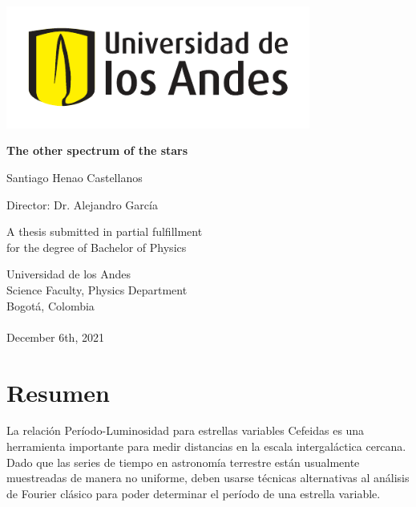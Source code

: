 \documentclass[12pt,letterpaper,oneside]{book}
\begin{document}
	\begin{titlepage}
		\begin{center}
			\includegraphics[width=10cm]{img/logo-uniandes.pdf}
			
			\vspace{2cm}
			
			{\fontsize{25}{40}\selectfont \bf The other spectrum of the stars\par}
			
			\vspace{10mm}
			
			{\huge Santiago Henao Castellanos}
			
			\vspace{10mm}
			
			{\huge Director: Dr. Alejandro García } 
			
			\vspace{15mm}
			
			{\large
				A thesis submitted in partial fulfillment\\
				for the degree of Bachelor of Physics
			}
			
			\vspace{5mm}
			
			{\Large
				Universidad de los Andes\\
				Science Faculty, Physics Department\\
				Bogotá, Colombia\\ \phantom{} \\
				December 6th, 2021
			}
		\end{center}
	\end{titlepage}

\frontmatter

\chapter*{Resumen}

La relación Período-Luminosidad para estrellas variables Cefeidas es una herramienta importante para medir distancias en la escala intergaláctica cercana.
Dado que las series de tiempo en astronomía terrestre están usualmente muestreadas de manera no uniforme, 
deben usarse técnicas alternativas al análisis de Fourier clásico para poder determinar el período de una estrella variable.
\end{document}
